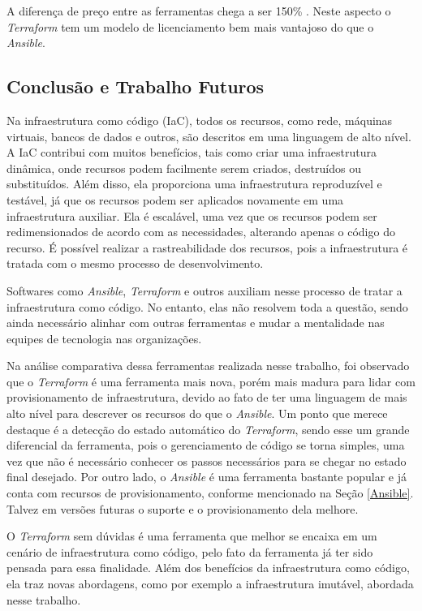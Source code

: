 A diferença de preço entre as ferramentas chega a ser 150\% . Neste aspecto o \textit{Terraform} tem um modelo de licenciamento bem mais vantajoso do que o \textit{Ansible}. 



\subsection{Conclusão e Trabalho Futuros}
Na infraestrutura como código (IaC), todos os recursos, como rede, máquinas virtuais, bancos de dados e outros, são descritos em uma linguagem de alto nível. A IaC contribui com muitos benefícios, tais como criar uma infraestrutura dinâmica, onde recursos podem facilmente serem criados, destruídos ou substituídos. Além disso, ela proporciona uma infraestrutura reproduzível e testável, já que os recursos podem ser aplicados novamente em uma infraestrutura auxiliar. Ela é escalável, uma vez que os recursos podem ser redimensionados de acordo com as necessidades, alterando apenas o código do recurso. É possível realizar a rastreabilidade dos recursos, pois a infraestrutura é tratada com o mesmo processo de desenvolvimento. 

Softwares como \textit{Ansible}, \textit{Terraform} e outros auxiliam nesse processo de tratar a infraestrutura como código. No entanto, elas não resolvem toda a questão, sendo ainda necessário alinhar com outras ferramentas e mudar a mentalidade nas equipes de tecnologia nas organizações. 

Na análise comparativa dessa ferramentas realizada nesse trabalho, foi observado que o \textit{Terraform} é uma ferramenta mais nova, porém mais madura para lidar com provisionamento de infraestrutura, devido ao fato de ter uma linguagem de mais alto nível para descrever os recursos do que o \textit{Ansible}. Um ponto que merece destaque é a detecção do estado automático do \textit{Terraform}, sendo esse um grande diferencial da ferramenta, pois o gerenciamento de código se torna simples, uma vez que não é necessário conhecer os passos necessários para se chegar no estado final desejado. Por outro lado, o \textit{Ansible} é uma ferramenta bastante popular e já conta com recursos de provisionamento, conforme mencionado na Seção \ref{Ansible}. Talvez em versões futuras o suporte e o provisionamento dela melhore. 

O \textit{Terraform} sem dúvidas é uma ferramenta que melhor se encaixa em um cenário de infraestrutura como código, pelo fato da ferramenta já ter sido pensada para essa finalidade. Além dos benefícios da infraestrutura como código, ela traz novas abordagens, como por exemplo a infraestrutura imutável, abordada nesse trabalho.  

